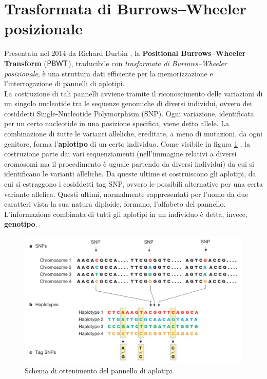 \section{Trasformata di Burrows--Wheeler posizionale}
\label{secpbwt}
Presentata nel 2014 da Richard Durbin \cite{pbwt}, la \textbf{Positional
  Burrows--Wheeler Transform} ($\mbox{\rm {\sf PBWT}}$), traducibile con
\textit{trasformata di Burrows--Wheeler posizionale}, è una struttura dati
efficiente
per la memorizzazione e l'interrogazione di pannelli di aplotipi.\\
La costruzione di tali pannelli avviene tramite il riconoscimento delle
variazioni di un singolo nucleotide tra le sequenze genomiche di diversi
individui, ovvero dei cosiddetti Single-Nucleotide Polymorphism
(SNP). Ogni variazione, identificata per un certo nucleotide in una
posizione specifica, viene 
detto allele. La combinazione di tutte le varianti alleliche,
ereditate, a meno di mutazioni, da ogni genitore, forma l'\textbf{aplotipo} di
un certo individuo. Come visibile in figura \ref{fig:haplo} \cite{haplo}, la 
costruzione parte dai
vari sequenziamenti (nell'immagine relativi a diversi cromosomi ma il
procedimento è uguale partendo da diversi individui) da cui si identificano le
varianti alleliche. Da queste ultime si costruiscono gli aplotipi, da cui si
estraggono i cosiddetti tag SNP, ovvero le possibili alternative per
una certa variante allelica. Questi ultimi, normalmente rappresentati per
l'uomo da due caratteri vista la sua natura diploide, formano,
l'alfabeto del pannello. 
L’informazione combinata di tutti gli aplotipi in un individuo è detta,
invece, \textbf{genotipo}.
\begin{figure}
  \centering
  \includegraphics[scale = 0.25]{img/haplo.jpg}
  \caption{Schema di ottenimento del pannello di aplotipi.}
  \label{fig:haplo}
\end{figure}
